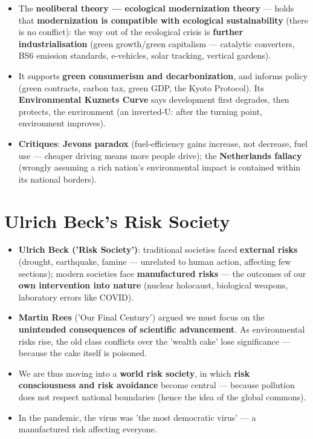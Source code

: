 \begin{KeyConcept}
\begin{itemize}
\item The \textbf{neoliberal theory --- ecological modernization theory} --- holds that \textbf{modernization is compatible with ecological sustainability} (there is no conflict): the way out of the ecological crisis is \textbf{further industrialisation} (green growth/green capitalism --- catalytic converters, BS6 emission standards, e-vehicles, solar tracking, vertical gardens).
\item It supports \textbf{green consumerism and decarbonization}, and informs policy (green contracts, carbon tax, green GDP, the Kyoto Protocol). Its \textbf{Environmental Kuznets Curve} says development first degrades, then protects, the environment (an inverted-U: after the turning point, environment improves).
\item \textbf{Critiques}: \textbf{Jevons paradox} (fuel-efficiency gains increase, not decrease, fuel use --- cheaper driving means more people drive); the \textbf{Netherlands fallacy} (wrongly assuming a rich nation's environmental impact is contained within its national borders).
\end{itemize}
\end{KeyConcept}

\section{Ulrich Beck's Risk Society}

\begin{KeyConcept}
\begin{itemize}
\item \textbf{Ulrich Beck ('Risk Society')}: traditional societies faced \textbf{external risks} (drought, earthquake, famine --- unrelated to human action, affecting few sections); modern societies face \textbf{manufactured risks} --- the outcomes of our \textbf{own intervention into nature} (nuclear holocaust, biological weapons, laboratory errors like COVID).
\item \textbf{Martin Rees} ('Our Final Century') argued we must focus on the \textbf{unintended consequences of scientific advancement}. As environmental risks rise, the old class conflicts over the 'wealth cake' lose significance --- because the cake itself is poisoned.
\item We are thus moving into a \textbf{world risk society}, in which \textbf{risk consciousness and risk avoidance} become central --- because pollution does not respect national boundaries (hence the idea of the global commons).
\item In the pandemic, the virus was 'the most democratic virus' --- a manufactured risk affecting everyone.
\end{itemize}
\end{KeyConcept}

